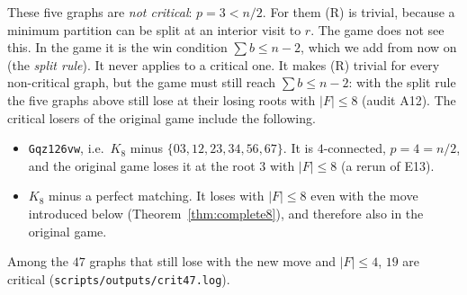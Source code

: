 \documentclass[11pt]{amsart}
\theoremstyle{definition}
\begin{document}
These five graphs are \emph{not critical}: $p=3<n/2$. For them (R) is trivial, because a minimum
partition can be split at an interior visit to $r$. The game does not see this. In the game it is
the win condition $\sum b\le n-2$, which we add from now on (the \emph{split rule}). It never
applies to a critical one. It makes (R) trivial for every non-critical graph, but the game must
still reach $\sum b\le n-2$: with the split rule the five graphs above still lose at their losing
roots with $|F|\le8$ (audit A12). The critical losers of the original
game include the following.
\begin{itemize}
\item \texttt{Gqz\char126vw}, i.e.\ $K_8$ minus $\{03,12,23,34,56,67\}$. It is $4$-connected,
$p=4=n/2$, and the original game loses it at the root $3$ with $|F|\le8$ (a rerun of E13).
\item $K_8$ minus a perfect matching. It loses with $|F|\le8$ even with the move introduced
below (Theorem~\ref{thm:complete8}), and therefore also in the original game.
\end{itemize}
Among the $47$ graphs that still lose with the new move and $|F|\le4$, $19$ are critical
(\texttt{scripts/outputs/crit47.log}).
\end{document}
